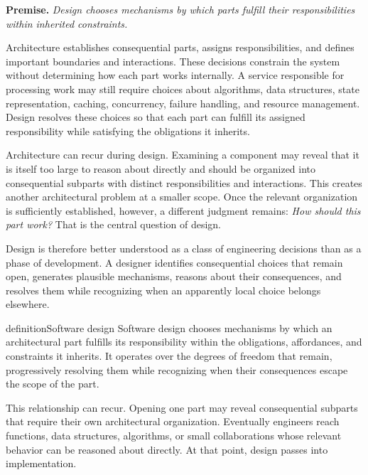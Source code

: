 \textbf{Premise.} \emph{Design chooses mechanisms by which parts fulfill their responsibilities within inherited constraints.}

Architecture establishes consequential parts, assigns responsibilities, and defines important boundaries and interactions.
These decisions constrain the system without determining how each part works internally.
A service responsible for processing work may still require choices about algorithms, data structures, state representation, caching, concurrency, failure handling, and resource management.
Design resolves these choices so that each part can fulfill its assigned responsibility while satisfying the obligations it inherits.

Architecture can recur during design.
Examining a component may reveal that it is itself too large to reason about directly and should be organized into consequential subparts with distinct responsibilities and interactions.
This creates another architectural problem at a smaller scope.
Once the relevant organization is sufficiently established, however, a different judgment remains: \emph{How should this part work?}
That is the central question of design.

Design is therefore better understood as a class of engineering decisions than as a phase of development.
A designer identifies consequential choices that remain open, generates plausible mechanisms, reasons about their consequences, and resolves them while recognizing when an apparently local choice belongs elsewhere.

\begin{bookbox}{definition}{Software design} %
Software design chooses mechanisms by which an architectural part fulfills its responsibility within
the obligations, affordances, and constraints it inherits. It operates over the degrees of freedom
that remain, progressively resolving them while recognizing when their consequences escape the scope
of the part.
\end{bookbox}

This relationship can recur.
Opening one part may reveal consequential subparts that require their own architectural organization.
Eventually engineers reach functions, data structures, algorithms, or small collaborations whose relevant behavior can be reasoned about directly.
At that point, design passes into implementation.

